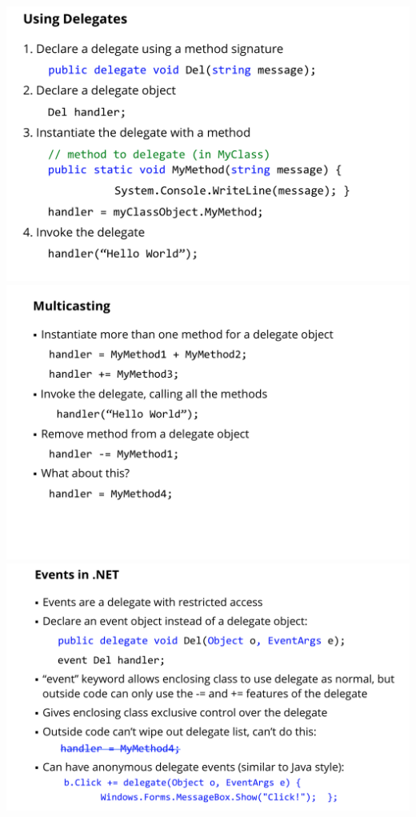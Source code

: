\documentclass[twoside]{article}
\begin{document}
\begin{center}
\includegraphics[scale=0.2]{28}\\
\includegraphics[scale=0.2]{29}\\
\includegraphics[scale=0.2]{30}
\end{center}
\end{document}
